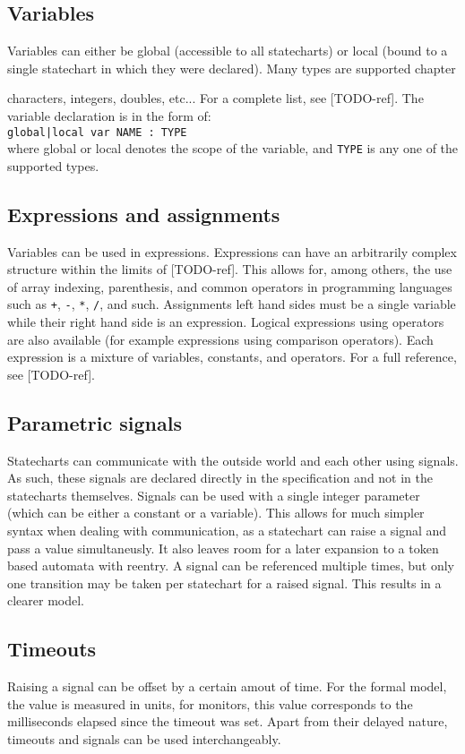   \subsection{Variables}
Variables can either be global (accessible to all statecharts) or local (bound to a single statechart in which they were declared). Many types are supported chapter{ characters, integers, doubles, etc... For a complete list, see [TODO-ref]. The variable declaration is in the form of: \\\verb!global|local var NAME : TYPE!\\ where global or local denotes the scope of the variable, and \verb!TYPE! is any one of the supported types.
  \subsection{Expressions and assignments}
Variables can be used in expressions. Expressions can have an arbitrarily complex structure within the limits of [TODO-ref]. This allows for, among others, the use of array indexing, parenthesis, and common operators in programming languages such as \verb!+!, \verb!-!, \verb!*!, \verb!/!, and such. Assignments left hand sides must be a single variable while their right hand side is an expression. Logical expressions using operators are also available (for example expressions using comparison operators). Each expression is a mixture of variables, constants, and operators. For a full reference, see [TODO-ref].
  \subsection{Parametric signals}
Statecharts can communicate with the outside world and each other using signals. As such, these signals are declared directly in the specification and not in the statecharts themselves. Signals can be used with a single integer parameter (which can be either a constant or a variable). This allows for much simpler syntax when dealing with communication, as a statechart can raise a signal and pass a value simultaneusly. It also leaves room for a later expansion to a token based automata with reentry.
A signal can be referenced multiple times, but only one transition may be taken per statechart for a raised signal. This results in a clearer model.
  \subsection{Timeouts}
Raising a signal can be offset by a certain amout of time. For the formal model, the value is measured in units, for monitors, this value corresponds to the milliseconds elapsed since the timeout was set. Apart from their delayed nature, timeouts and signals can be used interchangeably.
}
